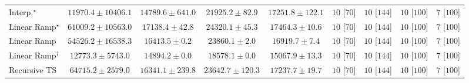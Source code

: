 \begin{tabular}{l|cccc|cccc|}
Interp.$^\star$ & {\cellcolor[HTML]{FFF3B2}} \color[HTML]{000000} $11970.4\pm 10406.1$ & {\cellcolor[HTML]{FFEEA8}} \color[HTML]{000000} $14789.6\pm 641.0$ & {\cellcolor[HTML]{FEDD84}} \color[HTML]{000000} $21925.2\pm 82.9$ & {\cellcolor[HTML]{FEE89D}} \color[HTML]{000000} $17251.8\pm 122.1$ & {\cellcolor[HTML]{49006A}} \color[HTML]{F1F1F1} $10$ [$70$] & {\cellcolor[HTML]{49006A}} \color[HTML]{F1F1F1} $10$ [$144$] & {\cellcolor[HTML]{49006A}} \color[HTML]{F1F1F1} $10$ [$100$] & {\cellcolor[HTML]{FFF7F3}} \color[HTML]{000000} $7$ [$100$] \\
Linear Ramp$^\star$ & {\cellcolor[HTML]{CB4B02}} \color[HTML]{F1F1F1} $61009.2\pm 10563.0$ & {\cellcolor[HTML]{FEE89D}} \color[HTML]{000000} $17138.4\pm 42.8$ & {\cellcolor[HTML]{FED676}} \color[HTML]{000000} $24320.1\pm 45.3$ & {\cellcolor[HTML]{FEE89B}} \color[HTML]{000000} $17464.3\pm 10.6$ & {\cellcolor[HTML]{49006A}} \color[HTML]{F1F1F1} $10$ [$70$] & {\cellcolor[HTML]{49006A}} \color[HTML]{F1F1F1} $10$ [$144$] & {\cellcolor[HTML]{49006A}} \color[HTML]{F1F1F1} $10$ [$100$] & {\cellcolor[HTML]{FFF7F3}} \color[HTML]{000000} $7$ [$100$] \\
Linear Ramp & {\cellcolor[HTML]{DF620D}} \color[HTML]{F1F1F1} $54526.2\pm 16538.3$ & {\cellcolor[HTML]{FEEAA1}} \color[HTML]{000000} $16413.5\pm 0.2$ & {\cellcolor[HTML]{FED778}} \color[HTML]{000000} $23860.1\pm 2.0$ & {\cellcolor[HTML]{FEE99E}} \color[HTML]{000000} $16919.7\pm 7.4$ & {\cellcolor[HTML]{49006A}} \color[HTML]{F1F1F1} $10$ [$70$] & {\cellcolor[HTML]{49006A}} \color[HTML]{F1F1F1} $10$ [$144$] & {\cellcolor[HTML]{49006A}} \color[HTML]{F1F1F1} $10$ [$100$] & {\cellcolor[HTML]{FFF7F3}} \color[HTML]{000000} $7$ [$100$] \\
Linear Ramp$^\dagger$ & {\cellcolor[HTML]{FFF1B0}} \color[HTML]{000000} $12773.3\pm 5743.0$ & {\cellcolor[HTML]{FEEDA6}} \color[HTML]{000000} $14894.2\pm 0.0$ & {\cellcolor[HTML]{FEE697}} \color[HTML]{000000} $18578.1\pm 0.0$ & {\cellcolor[HTML]{FEEDA6}} \color[HTML]{000000} $15067.9\pm 13.3$ & {\cellcolor[HTML]{49006A}} \color[HTML]{F1F1F1} $10$ [$70$] & {\cellcolor[HTML]{49006A}} \color[HTML]{F1F1F1} $10$ [$144$] & {\cellcolor[HTML]{49006A}} \color[HTML]{F1F1F1} $10$ [$100$] & {\cellcolor[HTML]{FFF7F3}} \color[HTML]{000000} $7$ [$100$] \\
Recursive TS & {\cellcolor[HTML]{B84203}} \color[HTML]{F1F1F1} $64715.2\pm 2579.0$ & {\cellcolor[HTML]{FEEAA1}} \color[HTML]{000000} $16341.1\pm 239.8$ & {\cellcolor[HTML]{FED87A}} \color[HTML]{000000} $23642.7\pm 120.3$ & {\cellcolor[HTML]{FEE89D}} \color[HTML]{000000} $17237.7\pm 19.7$ & {\cellcolor[HTML]{49006A}} \color[HTML]{F1F1F1} $10$ [$70$] & {\cellcolor[HTML]{49006A}} \color[HTML]{F1F1F1} $10$ [$144$] & {\cellcolor[HTML]{49006A}} \color[HTML]{F1F1F1} $10$ [$100$] & {\cellcolor[HTML]{FFF7F3}} \color[HTML]{000000} $7$ [$100$] \\

\end{tabular}
